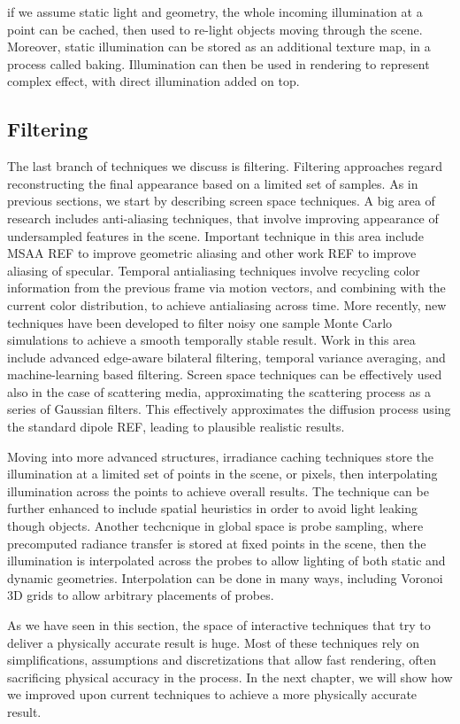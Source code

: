 if we assume static light and geometry, the whole incoming illumination at a point can be cached, then used to re-light objects moving through the scene. Moreover, static illumination can be stored as an additional texture map, in a process called baking. Illumination can then be used in rendering to represent complex effect, with direct illumination added on top. 

\subsection{Filtering}

The last branch of techniques we discuss is filtering. Filtering approaches regard reconstructing the final appearance based on a limited set of samples. As in previous sections, we start by describing screen space techniques. A big area of research includes anti-aliasing techniques, that involve improving appearance of undersampled features in the scene. Important technique in this area include MSAA REF to improve geometric aliasing and other work REF to improve aliasing of specular. Temporal antialiasing techniques involve recycling color information from the previous frame via motion vectors, and combining with the current color distribution, to achieve antialiasing across time. More recently, new techniques have been developed to filter noisy one sample Monte Carlo simulations to achieve a smooth temporally stable result. Work in this area include advanced edge-aware bilateral filtering, temporal variance averaging, and machine-learning based filtering. Screen space techniques can be effectively used also in the case of scattering media, approximating the scattering process as a series of Gaussian filters. This effectively approximates the diffusion process using the standard dipole REF, leading to plausible realistic results. 

Moving into more advanced structures, irradiance caching techniques store the illumination at a limited set of points in the scene, or pixels, then interpolating illumination across the points to achieve overall results. The technique can be further enhanced to include spatial heuristics in order to avoid light leaking though objects. Another techcnique in global space is probe sampling, where precomputed radiance transfer is stored at fixed points in the scene, then the illumination is interpolated across the probes to allow lighting of both static and dynamic geometries. Interpolation can be done in many ways, including Voronoi 3D grids to allow arbitrary placements of probes.

As we have seen in this section, the space of interactive techniques that try to deliver a physically accurate result is huge. Most of these techniques rely on simplifications, assumptions and discretizations that allow fast rendering, often sacrificing physical accuracy in the process. In the next chapter, we will show how we improved upon current techniques to achieve a more physically accurate result.
